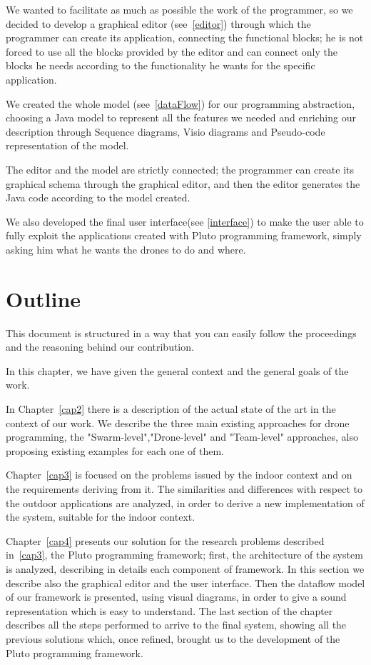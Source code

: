 We wanted to facilitate as much as possible the work of the programmer, so we decided to develop a graphical editor (see~\ref{editor}) through which the programmer  can create its application, connecting the functional blocks; he is not forced to use all the blocks provided by the editor and can connect only the blocks he needs according to the functionality he wants for the specific application.

We created the whole model (see~\ref{dataFlow}) for our programming abstraction, choosing a Java model to represent all the features we needed and enriching our description through Sequence diagrams, Visio diagrams and Pseudo-code representation of the model.

The editor and the model are strictly connected; the programmer can create its graphical schema through the graphical editor, and then the editor generates the Java code according to the model created.

We also developed the final user interface(see \ref{interface}) to make the user able to fully exploit the applications created with Pluto programming framework, simply asking him what he wants the drones to do and where.

\section{Outline}

This document is structured in a way that you can easily follow the proceedings and the reasoning behind our contribution.

In this chapter, we have given the general context and the general goals of the work.

In Chapter~\ref{cap2} there is a description of the actual state of the art in the context of our work.
We describe the three main existing approaches for drone programming, the "Swarm-level","Drone-level" and "Team-level" approaches, also proposing existing examples for each one of them.

Chapter~\ref{cap3} is focused on the problems issued by the indoor context and on the requirements deriving from it.
The similarities and differences with respect to the outdoor applications are analyzed, in order to derive a new implementation of the system, suitable for the indoor context.

Chapter~\ref{cap4} presents our solution for the research problems described in~\ref{cap3}, the Pluto programming framework; first, the architecture of the system is analyzed, describing in details each component of framework.
In this section we describe also the graphical editor and the user interface.
Then the dataflow model of our framework is presented, using visual diagrams, in order to give a sound representation which is easy to understand.
The last section of the chapter describes all the steps performed to arrive to the final system, showing all the previous solutions which, once refined, brought us to the development of the Pluto programming framework.

